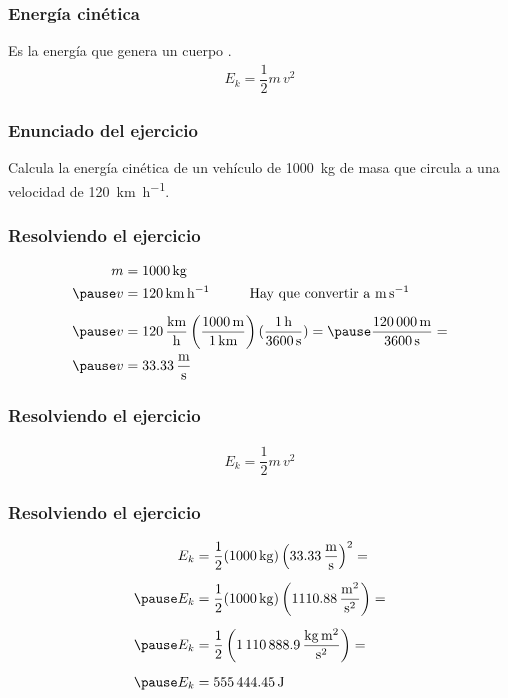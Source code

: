 \documentclass[14pt]{beamer}
\begin{document}
\begin{frame}
\frametitle{Energía cinética}
Es la energía que genera un cuerpo .
\pause
\begin{align*}
E_{k} = \dfrac{1}{2} m \, v^{2}
\end{align*}
\end{frame}
\begin{frame}
\frametitle{Enunciado del ejercicio}
Calcula la energía cinética de un vehículo de \SI{1000}{\kilo\gram} de masa que circula a una velocidad de \SI{120}{\kilo\meter\per\hour}.
\end{frame}
\begin{frame}
\frametitle{Resolviendo el ejercicio}
\vspace*{-1cm}
\begin{eqnarray*}
\begin{aligned}
m &= \SI{1000}{\kilo\gram} \\ \pause
v &= \SI{120}{\kilo\meter\per\hour} \hspace{1cm} \text{Hay que convertir a } \si{\meter\per\second} \\[0.5em] \pause
v &= \SI[per-mode=fraction]{120}{\kilo\meter\per\hour} \left( \dfrac{\SI{1000}{\meter}}{\SI{1}{\kilo\meter}} \right) (\dfrac{\SI{1}{\hour}}{\SI{3600}{\second}}) = \pause \dfrac{\SI{120000}{\meter}}{\SI{3600}{\second}} = \\ \pause
v &= \SI[per-mode=fraction]{33.33}{\meter\per\second}
\end{aligned}
\end{eqnarray*}
\end{frame}
\begin{frame}
\frametitle{Resolviendo el ejercicio}
\begin{align*}
E_{k} = \dfrac{1}{2} m \, v^{2}
\end{align*}
\end{frame}
\begin{frame}
\frametitle{Resolviendo el ejercicio}
\vspace*{-1cm}
\pause
\begin{eqnarray*}
\begin{aligned}
E_{k} &= \dfrac{1}{2} (\SI{1000}{\kilo\gram}) \left( \SI[per-mode=fraction]{33.33}{\meter\per\second} \right)^{2} = \\[0.5em] \pause
E_{k} &= \dfrac{1}{2} (\SI{1000}{\kilo\gram}) \left( \SI[per-mode=fraction]{1110.88}{\square\meter\per\square\second} \right) = \\[0.5em] \pause
E_{k} &= \dfrac{1}{2} \left( \SI[per-mode=fraction]{1110888.9}{\kilo\gram\square\meter\per\square\second} \right) = \\[0.5em] \pause
E_{k} &= \SI{555444.45}{\joule}
\end{aligned}
\end{eqnarray*}
\end{frame}
\end{document}
